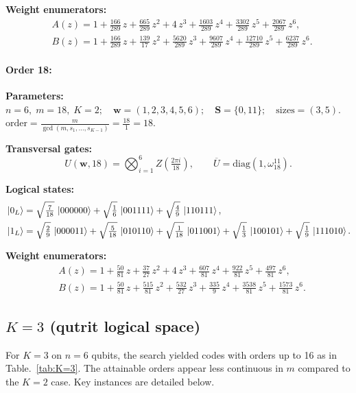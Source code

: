\documentclass[pdflatex,sn-nature]{sn-jnl}%
\theoremstyle{thmstyleone}%
\theoremstyle{thmstyletwo}%
\theoremstyle{thmstylethree}%
\begin{document}
\begin{appendices}
\noindent\textbf{Weight enumerators:}
\begin{align*}
    &A(z) = 1 + \tfrac{166}{289}\,z + \tfrac{665}{289}\,z^{2} + 4\,z^{3} + \tfrac{1603}{289}\,z^{4} + \tfrac{3302}{289}\,z^{5} + \tfrac{2067}{289}\,z^{6}, \\
    &B(z) = 1 + \tfrac{166}{289}\,z + \tfrac{139}{17}\,z^{2} + \tfrac{5620}{289}\,z^{3} + \tfrac{9607}{289}\,z^{4} + \tfrac{12710}{289}\,z^{5} + \tfrac{6237}{289}\,z^{6}.
\end{align*}

\paragraph{\textbf{Order 18:}}
\noindent\textbf{Parameters:} $n=6,\; m=18,\; K=2;\quad \mathbf w=(1, 2, 3, 4, 5, 6);\quad \mathbf S=\{0, 11\};\quad \text{sizes}=\left(3, 5\right).$ $\displaystyle \text{order}=\frac{m}{\gcd(m,s_1,\dots,s_{K-1})}=\frac{18}{1}=18.$

\noindent\textbf{Transversal gates:}
\[
    U(\mathbf w,18)=\bigotimes_{i=1}^{6} Z \left(\tfrac{2\pi i}{18}\right),\qquad
    \overline U=\mathrm{diag}(1,\omega_{18}^{11}).
\]

\noindent\textbf{Logical states:}
\begin{align*}
    &\ket{0_L} = \sqrt{\tfrac{7}{18}}\,\ket{000000} + \sqrt{\tfrac{1}{6}}\,\ket{001111} + \sqrt{\tfrac{4}{9}}\,\ket{110111}, \\
    &\ket{1_L} = \sqrt{\tfrac{2}{9}}\,\ket{000011} + \sqrt{\tfrac{5}{18}}\,\ket{010110} + \sqrt{\tfrac{1}{18}}\,\ket{011001} + \sqrt{\tfrac{1}{3}}\,\ket{100101} + \sqrt{\tfrac{1}{9}}\,\ket{111010}.
\end{align*}

\noindent\textbf{Weight enumerators:}
\begin{align*}
    &A(z) = 1 + \tfrac{50}{81}\,z + \tfrac{37}{27}\,z^{2} + 4\,z^{3} + \tfrac{607}{81}\,z^{4} + \tfrac{922}{81}\,z^{5} + \tfrac{497}{81}\,z^{6}, \\
    &B(z) = 1 + \tfrac{50}{81}\,z + \tfrac{515}{81}\,z^{2} + \tfrac{532}{27}\,z^{3} + \tfrac{335}{9}\,z^{4} + \tfrac{3538}{81}\,z^{5} + \tfrac{1573}{81}\,z^{6}.
\end{align*}

\subsection{$K=3$ (qutrit logical space)}

For $K=3$ on $n=6$ qubits, the search yielded codes with orders up to 16 as in Table.~\ref{tab:K=3}. The attainable orders appear less continuous in $m$ compared to the $K=2$ case. Key instances are detailed below.


\end{appendices}
\end{document}
